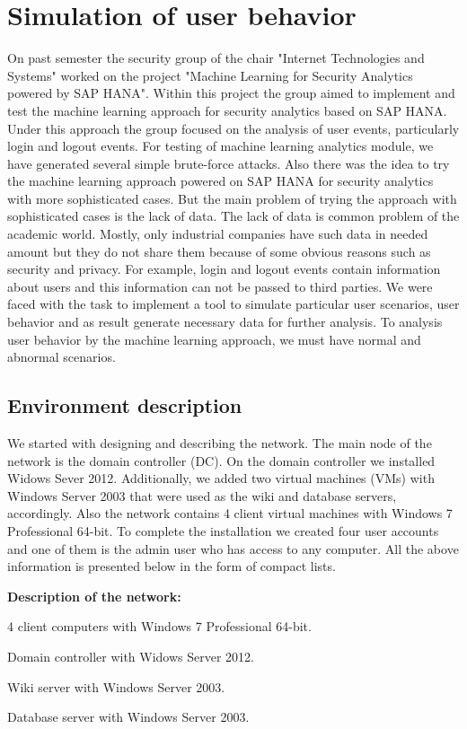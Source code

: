 \section{Simulation of user behavior}
On past semester the security group of the chair "Internet Technologies and Systems" worked on the project "Machine Learning for Security Analytics powered by SAP HANA". Within this project the group aimed to implement and test the machine learning approach for security analytics based on SAP HANA. Under this approach the group focused on the analysis of user events, particularly login and logout events. For testing of machine learning analytics module, we have generated several simple brute-force attacks. Also there was the idea to try the machine learning approach powered on SAP HANA for security analytics with more sophisticated cases. But the main problem of trying the approach with sophisticated cases is the lack of data. The lack of data is common problem of the academic world. Mostly, only industrial companies have such data in needed amount but they do not share them because of some obvious reasons such as security and privacy. For example, login and logout events contain information about users and this information can not be passed to third parties. We were faced with the task to implement a tool to simulate particular user scenarios, user behavior and as result generate necessary data for further analysis.
To analysis user behavior by the machine learning approach, we must have normal and abnormal scenarios.  
  
\subsection{Environment description}
We started with designing and describing the network. The main node of the network is the domain controller (DC). On the domain controller we installed Widows Sever 2012. Additionally, we added two virtual machines (VMs) with Windows Server 2003 that were used as the wiki and database servers, accordingly. Also the network contains 4 client virtual machines with Windows 7 Professional 64-bit. To complete the installation we created four user accounts and one of them is the admin user who has access to any computer. All the above information is presented below in the form of compact lists.

\begin{compactitem}
\item [\textbf{Description of the network:}]
\item 4 client computers with Windows 7 Professional 64-bit.
\item Domain controller with Widows Server 2012.
\item Wiki server with Windows Server 2003.
\item Database server with Windows Server 2003.
\end{compactitem}

